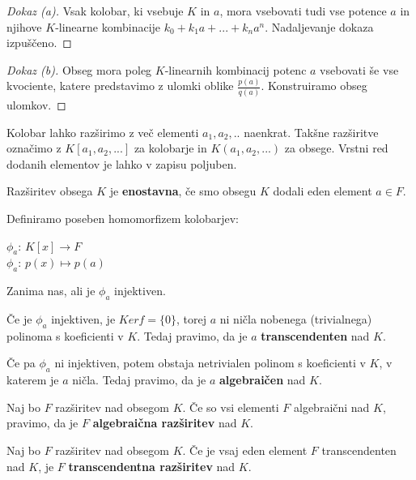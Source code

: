 \documentclass[11pt, a4paper]{article}
\begin{document}
    \begin{proof}[Dokaz \emph{(a)}]
        Vsak kolobar, ki vsebuje \(K\) in \(a\), mora vsebovati tudi vse potence \(a\) in njihove \(K\)-linearne kombinacije \(k_0 + k_1 a + ... + k_n a^n\). Nadaljevanje dokaza izpuščeno.
    \end{proof}

    \begin{proof}[Dokaz \emph{(b)}]
        Obseg mora poleg \(K\)-linearnih kombinacij potenc \(a\) vsebovati še vse kvociente, katere predstavimo z ulomki oblike \(\frac{p(a)}{q(a)}\). Konstruiramo obseg ulomkov.
    \end{proof}

    Kolobar lahko razširimo z več elementi \(a_1,a_2,..\) naenkrat. Takšne razširitve označimo z \(K[a_1,a_2,...]\) za kolobarje in \(K(a_1,a_2,...)\) za obsege. Vrstni red dodanih elementov je lahko v zapisu poljuben.

    \begin{definition}
        Razširitev obsega \(K\) je \textbf{enostavna}, če smo obsegu \(K\) dodali eden element \(a \in F\).
    \end{definition}

    Definiramo poseben homomorfizem kolobarjev:
    \begin{center}
        \(\phi_a\): \(K[x] \to F\) \\
        \(\phi_a\): \(p(x) \mapsto p(a)\)
    \end{center}

    Zanima nas, ali je \(\phi_a\) injektiven.
    \par
    Če je \(\phi_a\) injektiven, je \(Ker f = \{0\}\), torej \(a\) ni ničla nobenega (trivialnega) polinoma s koeficienti v \(K\). Tedaj pravimo, da je \(a\) \textbf{transcendenten} nad \(K\).
    \par
    Če pa \(\phi_a\) ni injektiven, potem obstaja netrivialen polinom s koeficienti v \(K\), v katerem je \(a\) ničla. Tedaj pravimo, da je \(a\) \textbf{algebraičen} nad \(K\).
    
    \begin{definition}
        Naj bo \(F\) razširitev nad obsegom \(K\). Če so vsi elementi \(F\) algebraični nad \(K\), pravimo, da je \(F\) \textbf{algebraična razširitev} nad \(K\).
    \end{definition}

    \begin{definition}
        Naj bo \(F\) razširitev nad obsegom \(K\). Če je vsaj eden element \(F\) transcendenten nad \(K\), je \(F\) \textbf{transcendentna razširitev} nad \(K\). 
    \end{definition}
\end{document}
